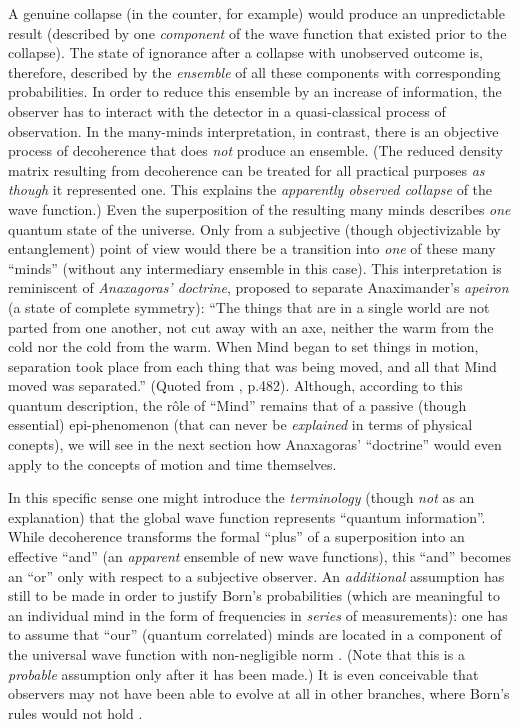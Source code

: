 \documentclass[12pt]{article}
\newcommand{\ts}{\hspace{3pt}}
\begin{document}
A genuine collapse (in the counter, for example) would produce an
unpredictable result (described by one {\it component} of the
wave function that existed prior to the collapse). The state of
ignorance after a collapse with unobserved outcome is, therefore,
described by the {\it ensemble} of all these components with
corresponding probabilities. In order to reduce this ensemble by an
increase of information, the observer has to interact with the
detector in a quasi-classical process of observation. In the many-minds
interpretation, in contrast, there is an objective process of
decoherence that does {\it not} produce an ensemble. (The reduced
density matrix resulting from decoherence can be treated for all
practical purposes {\it as though} it represented one. This explains
the {\it apparently observed collapse} of the wave function.) Even the
superposition of the resulting many minds describes {\it one} quantum
state of the universe. Only from a subjective (though objectivizable
by entanglement) point of view would there be a transition into {\it
one} of these many ``minds'' (without any intermediary ensemble in
this case). This interpretation is reminiscent of {\it Anaxagoras'
doctrine}, proposed to separate Anaximander's  {\it apeiron} (a state
of complete symmetry): ``The things that are in a single world are not
parted from one another, not cut away with an axe, neither the warm
from the cold nor the cold from the warm. When Mind began to set
things in motion, separation took place from each thing that was being
moved, and all that Mind moved was separated.'' (Quoted from
\cite{Jammer}, p.\ts 482). Although, according to this quantum
description, the r\^ole of ``Mind'' remains that of a passive (though
essential) epi-phenomenon (that can never be {\it explained} in terms
of physical conepts), we will see in the next section how Anaxagoras'
``doctrine'' would even apply to the concepts of motion and time
themselves.
 
In this specific sense one might introduce the {\it terminology}
(though {\it not} as an explanation) that the global wave function
represents ``quantum information''. While decoherence transforms the
formal ``plus'' of a superposition into an effective ``and'' (an {\it
apparent} ensemble of new wave functions), this ``and'' becomes an
``or'' only with respect to a subjective observer. An {\it additional}
assumption has still to be made in order to justify Born's
probabilities (which are meaningful to an individual mind in the form
of frequencies in {\it series} of measurements): one has to assume
that ``our'' (quantum correlated) minds are located in a component of
the universal wave function with non-negligible norm
\cite{graham}. (Note that this is a {\it probable} assumption only
after it has been made.) It is even conceivable that observers may not
have been able to evolve at all in other branches, where
Born's rules would not hold
\cite{Saunders}.
\end{document}
